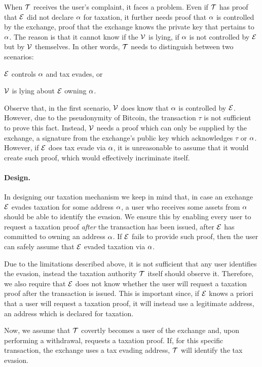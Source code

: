 When $\mathcal{T}$ receives the user's complaint, it faces a problem. Even if
$\mathcal{T}$ has proof that $\mathcal{E}$ did not declare $\alpha$ for taxation,
it further needs proof that $\alpha$ is controlled by the exchange, \ie proof
that the exchange knows the private key that pertains to $\alpha$. The reason
is that it cannot know if the $\mathcal{V}$ is lying, \ie if $\alpha$ is not
controlled by $\mathcal{E}$ but by $\mathcal{V}$ themselves. In other words, $\mathcal{T}$
needs to distinguish between two scenarios:
\begin{inparaenum}[i)]
    \item $\mathcal{E}$ controls $\alpha$ and tax evades, or
    \item $\mathcal{V}$ is lying about $\mathcal{E}$ owning $\alpha$.
\end{inparaenum}

Observe that, in the first scenario, $\mathcal{V}$ does know that $\alpha$ is
controlled by $\mathcal{E}$. However, due to the pseudonymity of Bitcoin, the
transaction $\tau$ is not sufficient to prove this fact. Instead, $\mathcal{V}$
needs a proof which can only be supplied by the exchange, \eg a signature from
the exchange's public key which acknowledges $\tau$ or $\alpha$. However, if
$\mathcal{E}$ does tax evade via $\alpha$, it is unreasonable to assume that it
would create such proof, which would effectively incriminate itself.

\paragraph{Design.}

In designing our taxation mechanism we keep in mind that, in case an exchange
$\mathcal{E}$ evades taxation for some address $\alpha$, a user who receives
some assets from $\alpha$ should be able to identify the evasion.  We ensure
this by enabling every user to request a taxation proof \emph{after} the
transaction has been issued, \ie after $\mathcal{E}$ has committed to owning an
address $\alpha$. If $\mathcal{E}$ fails to provide such proof, then the user
can safely assume that $\mathcal{E}$ evaded taxation via $\alpha$.

Due to the limitations described above, it is not sufficient that any user
identifies the evasion, instead the taxation authority $\mathcal{T}$ itself should
observe it. Therefore, we also require that $\mathcal{E}$ does not know whether
the user will request a taxation proof after the transaction is issued. This is
important since, if $\mathcal{E}$ knows a priori that a user will request a
taxation proof, it will instead use a legitimate address, \ie an address which
is declared for taxation.

Now, we assume that $\mathcal{T}$ covertly becomes a user of the exchange and,
upon performing a withdrawal, requests a taxation proof. If, for this specific
transaction, the exchange uses a tax evading address, $\mathcal{T}$ will identify
the tax evasion.
